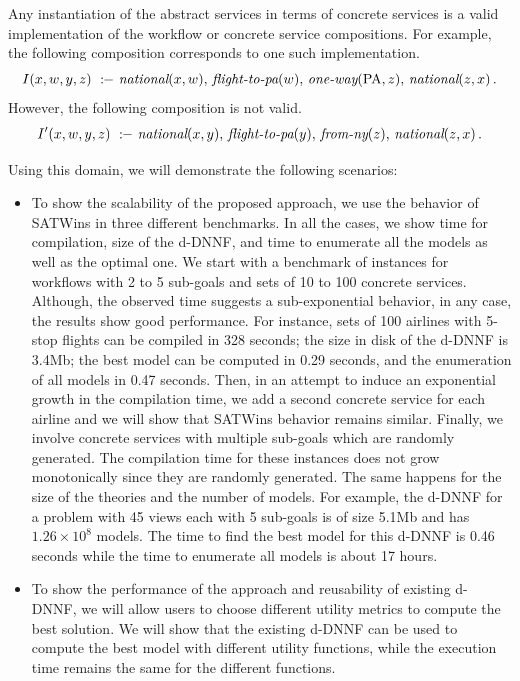 \documentclass{llncs}
\newcommand{\qrule}{:\!\!-}
\newcommand{\national}{\text{\it national}}
\newcommand{\oneway}{\text{\it one-way}}
\newcommand{\flightPA}{\text{\it flight-to-pa}}
\newcommand{\fromNY}{\text{\it from-ny}}
\newcommand{\PA}{\text{PA}}
\begin{document}
Any instantiation of the abstract services in terms of
concrete services is a valid implementation of the workflow or concrete service compositions.
For example, the following composition corresponds to one such implementation.
\[ I(x,w,y,z)\ \qrule\ \national(x,w),\,\flightPA(w),\,\oneway(\PA,z),\,\national(z,x)\,. \]
However, the following composition is not valid.
\begin{alignat*}{1}
I'(x,w,y,z)\  \qrule\ &\national(x,y),\,\flightPA(y),\,\fromNY(z),\,\national(z,x)\,. \\
\end{alignat*}

Using this domain, we will demonstrate the following scenarios:
\begin{itemize}
\item To show the scalability of the proposed approach, we use the behavior of SATWins in three different benchmarks. In all the cases, we show time for compilation, size of the  d-DNNF, and time to enumerate all the models as well as the optimal one. We start with a benchmark of instances for workflows with 2 to 5 sub-goals and sets of 10 to 100 concrete services. Although, the observed time suggests a sub-exponential behavior,  in any case, the results
show good performance. For instance, sets of 100
airlines with 5-stop flights can be compiled in 328 seconds; the size in disk of the d-DNNF is 3.4Mb;
the best model can be computed in 0.29 seconds, and the enumeration of all models in 0.47 seconds.
Then, in an attempt to induce an exponential growth in the compilation time, we add a second concrete service for each airline and we will show that SATWins behavior remains similar. Finally, we  involve concrete services with multiple sub-goals which are randomly generated.  The compilation time for these instances does not grow monotonically
since they are randomly generated. The same happens for the size of
the theories and the number of models. For example, the d-DNNF for 
a problem with 45 views each with 5 sub-goals is of size 5.1Mb and has
$1.26\times 10^8$ models. The time to find the best model for
this d-DNNF is 0.46 seconds while the time to enumerate all models
is about 17 hours.
\item To show the performance of the approach and reusability of existing d-DNNF, we will allow users to choose different utility metrics to compute the best solution.  We will show that the existing d-DNNF can be used to compute the best model with different utility functions, while the execution time remains the same for the different functions. 
\end{itemize}
\end{document}
